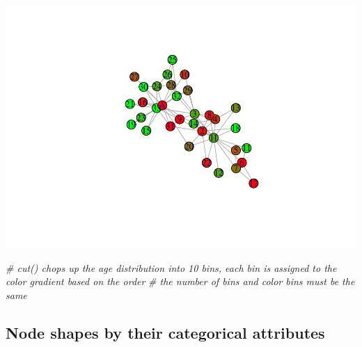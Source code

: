 \documentclass[
]{book}
\newenvironment{Shaded}{\begin{snugshade}}{\end{snugshade}}
\newcommand{\AttributeTok}[1]{\textcolor[rgb]{0.13,0.29,0.53}{#1}}
\newcommand{\CommentTok}[1]{\textcolor[rgb]{0.56,0.35,0.01}{\textit{#1}}}
\newcommand{\FunctionTok}[1]{\textcolor[rgb]{0.13,0.29,0.53}{\textbf{#1}}}
\newcommand{\NormalTok}[1]{#1}
\newcommand{\SpecialCharTok}[1]{\textcolor[rgb]{0.81,0.36,0.00}{\textbf{#1}}}
\newcommand{\StringTok}[1]{\textcolor[rgb]{0.31,0.60,0.02}{#1}}
\begin{document}
\includegraphics{bookdown-demo_files/figure-latex/unnamed-chunk-179-2.pdf}

\begin{Shaded}
\begin{Highlighting}[]
\CommentTok{\# cut() chops up the age distribution into 10 bins, each bin is assigned to the color gradient based on the order }
\CommentTok{\# the number of bins and color bins must be the same }
\end{Highlighting}
\end{Shaded}

\subsection{Node shapes by their categorical attributes}\label{node-shapes-by-their-categorical-attributes}

\begin{Shaded}
\end{Shaded}
\end{document}
